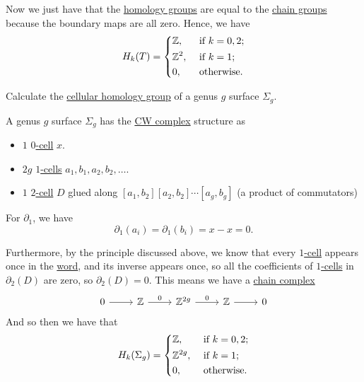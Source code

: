 \begin{explanation}
	Now we just have that the \hyperref[def:cellular-homology-group]{homology groups} are equal to the \hyperref[def:cellular-chain-complex]{chain groups}
	because the boundary maps are all zero. Hence, we have
	\[
		H_{k}(T) = \begin{dcases}
			\mathbb{\MakeUppercase{z}} ,     & \text{ if } k = 0, 2 ; \\
			\mathbb{\MakeUppercase{z}} ^{2}, & \text{ if } k = 1;     \\
			0,                               & \text{ otherwise}.
		\end{dcases}
	\]
\end{explanation}

\begin{eg}
	Calculate the \hyperref[def:cellular-homology-group]{cellular homology group} of a genus \(g\) surface \(\Sigma _g\).
\end{eg}
\begin{explanation}
	A genus \(g\) surface \(\Sigma_g\) has the \hyperref[def:CW-Complex]{CW complex} structure as
	\begin{itemize}
		\item \(1\) \hyperref[def:cell]{\(0\)-cell} \(x\).
		\item \(2g\) \hyperref[def:cell]{\(1\)-cells} \(a_1, b_1, a_2, b_2, \ldots\).
		\item \(1\) \hyperref[def:cell]{\(2\)-cell} \(D\) glued along \([a_1, b_2][a_2, b_2]\cdots[a_g, b_g]\) (a product of commutators)
	\end{itemize}

	For \(\partial _1\), we have
	\[
		\partial_1(a_i) = \partial_1(b_i) = x - x = 0.
	\]

	Furthermore, by the principle discussed above, we know that every \hyperref[def:cell]{\(1\)-cell} appears once in the \hyperref[def:word]{word}, and its inverse appears once,
	so all the coefficients of \hyperref[def:cell]{\(1\)-cells} in \(\partial_2(D)\) are zero, so \(\partial_2(D) = 0\). This means we have a \hyperref[def:cellular-chain-complex]{chain complex}
	\[
		\begin{tikzcd}
			0 & {\mathbb{Z}} & {\mathbb{Z}^{2g}} & {\mathbb{Z}} & 0
			\arrow[from=1-1, to=1-2]
			\arrow["0", from=1-2, to=1-3]
			\arrow["0", from=1-3, to=1-4]
			\arrow[from=1-4, to=1-5]
		\end{tikzcd}
	\]
	And so then we have that
	\[
		H_k(\Sigma _{g} ) = \begin{dcases}
			\mathbb{\MakeUppercase{z}} ,      & \text{ if } k = 0, 2 ; \\
			\mathbb{\MakeUppercase{z}} ^{2g}, & \text{ if } k = 1;     \\
			0,                                & \text{ otherwise}.
		\end{dcases}
	\]
\end{explanation}

